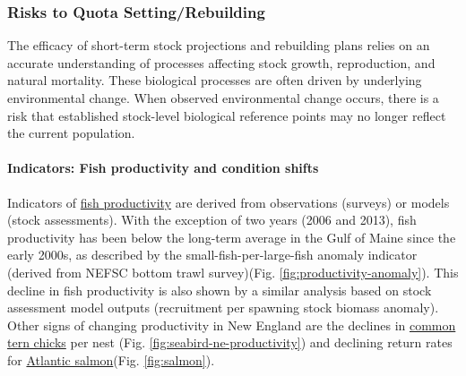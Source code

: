 \documentclass[
  10pt,
]{article}
\begin{document}
\hypertarget{risks-to-quota-settingrebuilding}{%
\subsubsection{Risks to Quota Setting/Rebuilding}\label{risks-to-quota-settingrebuilding}}

The efficacy of short-term stock projections and rebuilding plans relies on an accurate understanding of processes affecting stock growth, reproduction, and natural mortality. These biological processes are often driven by underlying environmental change. When observed environmental change occurs, there is a risk that established stock-level biological reference points may no longer reflect the current population.

\hypertarget{indicators-fish-productivity-and-condition-shifts}{%
\paragraph{Indicators: Fish productivity and condition shifts}\label{indicators-fish-productivity-and-condition-shifts}}

Indicators of \href{https://noaa-edab.github.io/catalog/fish-productivity-indicators.html}{fish productivity} are derived from observations (surveys) or models (stock assessments). With the exception of two years (2006 and 2013), fish productivity has been below the long-term average in the Gulf of Maine since the early 2000s, as described by the small-fish-per-large-fish anomaly indicator (derived from NEFSC bottom trawl survey)(Fig. \ref{fig:productivity-anomaly}). This decline in fish productivity is also shown by a similar analysis based on stock assessment model outputs (recruitment per spawning stock biomass anomaly). Other signs of changing productivity in New England are the declines in \href{https://noaa-edab.github.io/catalog/seabird-diet-and-productivity---new-england.html}{common tern chicks} per nest (Fig. \ref{fig:seabird-ne-productivity}) and declining return rates for \href{https://noaa-edab.github.io/catalog/gulf-of-maine-atlantic-salmon.html}{Atlantic salmon}(Fig. \ref{fig:salmon}).
\end{document}
